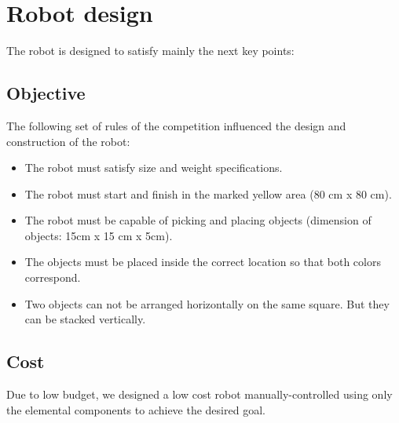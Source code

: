 \documentclass[preprint,12pt,3p]{elsarticle}
\begin{document}
\newpage

\section{Robot design}

The robot is designed to satisfy mainly the next key points:

\subsection{Objective}

The following set of rules of the competition influenced the design and construction of the robot:

\begin{itemize}

    \item The robot must satisfy size and weight specifications.

    \item The robot must start and finish in the marked yellow area (80 cm x 80 cm).
    
    \item The robot must be capable of picking and placing objects (dimension of objects: 15cm x 15 cm x 5cm).
    
    \item The objects must be placed inside the correct location so that both colors correspond. 
    
    \item Two objects can not be arranged horizontally on the same square. But they can be stacked vertically.
\end{itemize}

\subsection{Cost}

Due to low budget, we designed a low cost robot manually-controlled using only the elemental components to achieve the desired goal.

\bigskip
\end{document}

